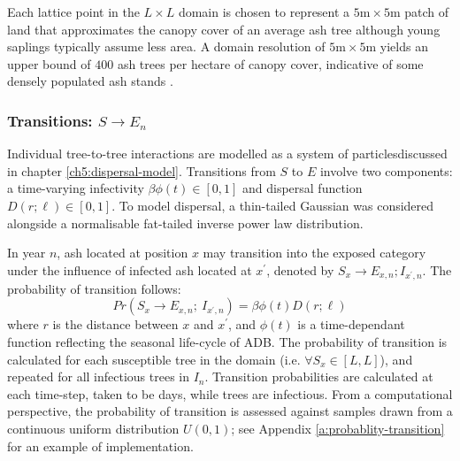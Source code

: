 Each lattice point in the $L\times L$ domain is chosen to represent a $5\mathrm{m}\times5\mathrm{m}$ patch of land that approximates the canopy cover of an average ash tree
\textemdash although young saplings typically assume less area. 
A domain resolution of $5\mathrm{m}\times5\mathrm{m}$ yields an upper bound of $400$ ash trees per hectare of canopy cover, indicative of some densely populated ash stands \cite{ash-tree2, ash-tree1}. %

\subsubsection{Transitions: $S\rightarrow E_n$}

Individual tree-to-tree interactions are modelled as a system of particles\textemdash discussed in chapter \ref{ch5:dispersal-model}.
Transitions from $S$ to $E$ involve two components: a time-varying infectivity $\beta\phi(t)\in [0, 1]$ and dispersal function $D(r; \ell)\in [0, 1]$.
To model dispersal, a thin-tailed Gaussian was considered alongside a normalisable fat-tailed inverse power law distribution.

In year $n$, ash located at position $x$ may transition into the exposed category under the influence of infected ash located at $x^\prime$, denoted by $S_x \rightarrow E_{x,n}; I_{x^\prime, n}$.
The probability of transition follows:
\begin{equation}
    Pr(S_{x} \rightarrow E_{x,n} ;\ I_{x^{\prime}, n} ) = \beta  \phi(t) D(r;\ell)
\end{equation}
where $r$ is the distance between $x$ and $x^{\prime}$, and $\phi(t)$ is a time-dependant function reflecting the seasonal life-cycle of ADB.
The probability of transition is calculated for each susceptible tree in the domain (i.e. $\forall S_x \in [L, L]$),
and repeated for all infectious trees in $I_n$.
Transition probabilities are calculated at each time-step, taken to be days, while trees are infectious.
From a computational perspective, the probability of transition is assessed against samples drawn from a continuous uniform distribution $U(0, 1)$;
see Appendix \ref{a:probablity-transition} for an example of implementation.


